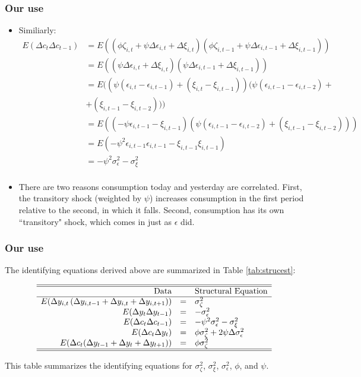 \documentclass{beamer}
\begin{document}
\begin{frame}
\frametitle[alignment=center]{Our use}
\begin{itemize}
\item Similiarly:  
\footnotesize
\begin{align*}
E(\Delta c_{t}\Delta c_{t-1}) & = E\left(\left(\phi \zeta_{i,t}+\psi \Delta \epsilon_{i,t}+\Delta \xi_{i,t}\right)\left(\phi \zeta_{i,t-1}+\psi \Delta \epsilon_{i,t-1}+\Delta \xi_{i,t-1}\right)\right)\\
& = E\left(\left(\psi \Delta \epsilon_{i,t}+\Delta \xi_{i,t}\right)\left(\psi \Delta \epsilon_{i,t-1}+\Delta \xi_{i,t-1}\right)\right)\\
& = E(\left(\psi (\epsilon_{i,t}-\epsilon_{i,t-1})+(\xi_{i,t}-\xi_{i,t-1})\right)(\psi (\epsilon_{i,t-1}-\epsilon_{i,t-2})+\\
 & +(\xi_{i,t-1}-\xi_{i,t-2})))\\
& = E\left(\left(-\psi\epsilon_{i,t-1}-\xi_{i,t-1}\right)\left(\psi (\epsilon_{i,t-1}-\epsilon_{i,t-2})+(\xi_{i,t-1}-\xi_{i,t-2})\right)\right)\\
& = E\left(-\psi^2 \epsilon_{i,t-1}\epsilon_{i,t-1}-\xi_{i,t-1}\xi_{i,t-1}\right)\\
& = -\psi^2\sigma^2_\epsilon-\sigma^2_\xi\\
\end{align*}
\item There are two reasons consumption today and yesterday are correlated.  First, the transitory shock (weighted by $\psi$) increases consumption in the first period relative to the second, in which it falls.  Second, consumption has its own ``transitory" shock, which comes in just as $\epsilon$ did.
\end{itemize}
\end{frame}

\begin{frame}
\frametitle[alignment=center]{Our use}
The identifying equations derived above are summarized in Table \ref{tab:strucest}:
\begin{table}[ht!]
$$
\begin{array}{rcl}
\hline\hline
\text{Data} & & \text{Structural Equation}\\
\hline
E(\Delta y_{i,t}\left(\Delta y_{i,t-1}+\Delta y_{i,t}+\Delta y_{i,t+1}\right)) & = &\sigma^2_\zeta\\
E(\Delta y_{t}\Delta y_{t-1}) & = & -\sigma^2_\epsilon\\
E(\Delta c_{t}\Delta c_{t-1}) & = &-\psi^2\sigma^2_\epsilon-\sigma^2_\xi\\
E(\Delta c_t\Delta y_{t}) & = & \phi \sigma_\zeta^2+2\psi \Delta \sigma_\epsilon^2\\
E(\Delta c_t(\Delta y_{t-1}+\Delta y_{t}+\Delta y_{t+1}))  & = & \phi\sigma^2_\zeta  \\
\hline\hline
\end{array}$$
\caption{This table summarizes the identifying equations for $\sigma^2_\zeta$, $\sigma^2_\xi$, $\sigma^2_\epsilon$, $\phi$, and $\psi$. }
\label{tab:strucest}
\end{table}
\end{frame}
\end{document}
